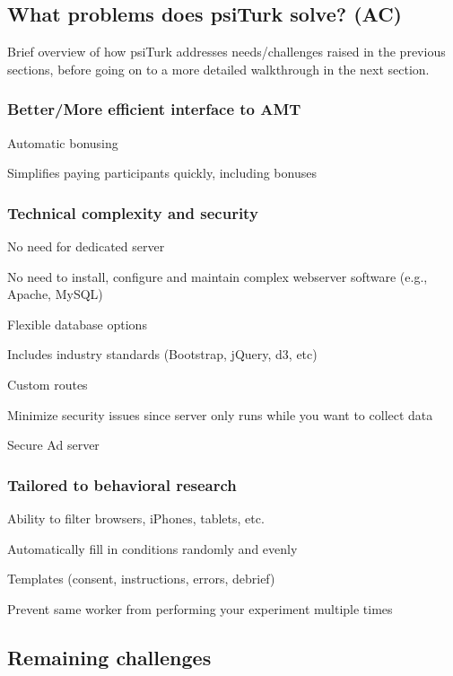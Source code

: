 \documentclass[twocolumn]{svjour3}          %
\begin{document}
\subsection{What problems does psiTurk solve? (AC)}

Brief overview of how psiTurk addresses needs/challenges raised in the previous sections, before going on to a more detailed walkthrough in the next section.


\subsubsection{Better/More efficient interface to AMT}

Automatic bonusing

Simplifies paying participants quickly, including bonuses


\subsubsection{Technical complexity and security}

No need for dedicated server

No need to install, configure and maintain complex webserver software (e.g., Apache, MySQL)

Flexible database options

Includes industry standards (Bootstrap, jQuery, d3, etc)

Custom routes

Minimize security issues since server only runs while you want to collect data

Secure Ad server

\subsubsection{Tailored to behavioral research}

Ability to filter browsers, iPhones, tablets, etc. 

Automatically fill in conditions randomly and evenly

Templates (consent, instructions, errors, debrief)

Prevent same worker from performing your experiment multiple times




\subsection{Remaining challenges}
\end{document}
